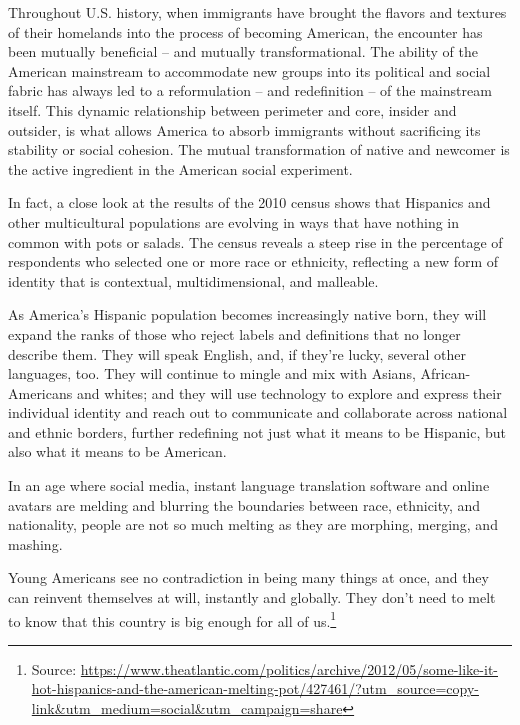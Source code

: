 \documentclass[10pt,a4paper]{article}
\newcommand{\source}[1]{\footnote{Source: \href{#1}{#1}}}
\begin{document}
Throughout U.S. history, when immigrants have brought the flavors and textures of their homelands into the process of becoming American, the encounter has been mutually beneficial -- and mutually transformational. The ability of the American mainstream to accommodate new groups into its political and social fabric has always led to a reformulation -- and redefinition -- of the mainstream itself. This dynamic relationship between perimeter and core, insider and outsider, is what allows America to absorb immigrants without sacrificing its stability or social cohesion. The mutual transformation of native and newcomer is the active ingredient in the American social experiment.

In fact, a close look at the results of the 2010 census shows that Hispanics and other multicultural populations are evolving in ways that have nothing in common with pots or salads. The census reveals a steep rise in the percentage of respondents who selected one or more race or ethnicity, reflecting a new form of identity that is contextual, multidimensional, and malleable.

As America's Hispanic population becomes increasingly native born, they will expand the ranks of those who reject labels and definitions that no longer describe them. They will speak English, and, if they're lucky, several other languages, too. They will continue to mingle and mix with Asians, African-Americans and whites; and they will use technology to explore and express their individual identity and reach out to communicate and collaborate across national and ethnic borders, further redefining not just what it means to be Hispanic, but also what it means to be American.

In an age where social media, instant language translation software and online avatars are melding and blurring the boundaries between race, ethnicity, and nationality, people are not so much melting as they are morphing, merging, and mashing.

Young Americans see no contradiction in being many things at once, and they can reinvent themselves at will, instantly and globally. They don't need to melt to know that this country is big enough for all of us.\source{https://www.theatlantic.com/politics/archive/2012/05/some-like-it-hot-hispanics-and-the-american-melting-pot/427461/?utm_source=copy-link&utm_medium=social&utm_campaign=share}
\end{document}
